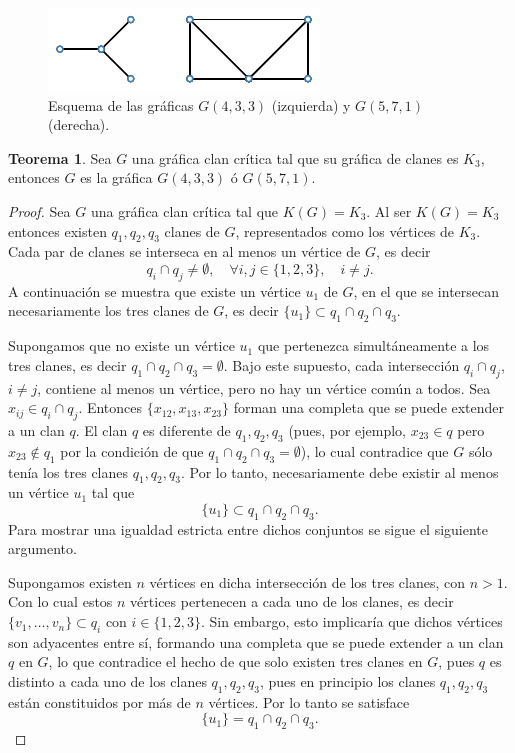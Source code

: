 \documentclass[12pt]{book}
\theoremstyle{definition}
\newtheorem{theorem}{Teorema}[chapter]
\begin{document}
\begin{figure}[!htbp]
	\centering
	\includegraphics[scale=1.2]{Fig0.pdf}
	\caption{Esquema de las gráficas $G(4,3,3)$ (izquierda) y $G(5,7,1)$ (derecha).\label{F1}}
\end{figure}

\begin{theorem}
	Sea $G$ una gráfica clan crítica tal que su gráfica de clanes es $K_3$, entonces $G$ es la gráfica $G(4,3,3)$ ó $G(5,7,1)$.
\end{theorem}
\begin{proof}
Sea $G$ una gráfica clan crítica tal que $K(G)=K_3$. Al ser $K(G)=K_3$ entonces existen $q_1,q_2,q_3$ clanes de $G$, representados como los vértices de $K_3$. Cada par de clanes se interseca en al menos un vértice de $G$, es decir
\begin{equation*}
q_i\cap q_j\neq \emptyset, \quad \forall i,j\in\{1,2,3\},\quad i\neq j.
\end{equation*}
A continuación se muestra que existe un vértice $u_1$ de $G$, en el que se intersecan necesariamente los tres clanes de $G$, es decir $\{u_1\}\subset q_1\cap q_2 \cap q_3$. 

Supongamos que no existe un vértice $u_1$ que pertenezca simultáneamente a los tres clanes, es decir  $q_1\cap q_2 \cap q_3=\emptyset$. Bajo este supuesto, cada intersección $q_i\cap q_j$, $i\neq j$, contiene al menos un vértice, pero no hay un vértice común a todos. Sea $x_{ij}\in q_{i}\cap q_{j}$. Entonces $\{x_{12},x_{13},x_{23}\}$ forman una completa que se puede extender a un clan $q$. El clan $q$ es diferente de $q_{1},q_{2},q_{3}$ (pues, por ejemplo, $x_{23}\in q$ pero $x_{23}\not\in q_{1}$ por la condición de que $q_{1}\cap q_{2}\cap q_{3}=\emptyset$), lo cual contradice que $G$ sólo tenía los tres clanes $q_{1},q_{2},q_{3}$. 
Por lo tanto, necesariamente debe existir al menos un vértice $u_1$ tal que
\begin{equation*}
\{u_1\}\subset q_1\cap q_2 \cap q_3.
\end{equation*}
Para mostrar una igualdad estricta entre dichos conjuntos se sigue el siguiente argumento.

Supongamos existen $n$ vértices en dicha intersección de los tres clanes, con $n>1$. Con lo cual estos $n$ vértices pertenecen a cada uno de los clanes, es decir $\{v_1, \dots , v_n\} \subset q_i$ con $i\in\{1,2,3\}$. Sin embargo, esto implicaría que dichos vértices son adyacentes entre sí, formando una completa que se puede extender a un clan $q$ en $G$, lo que contradice el hecho de que solo existen tres clanes en $G$, pues $q$ es distinto a cada uno de los clanes $q_{1},q_{2},q_{3}$, pues en principio los clanes $q_{1},q_{2},q_{3}$ están constituidos por más de $n$ vértices. Por lo tanto se satisface 
\begin{equation*}
	\{u_1\}=q_1\cap q_2 \cap q_3.
\end{equation*}


\end{proof}
\end{document}
